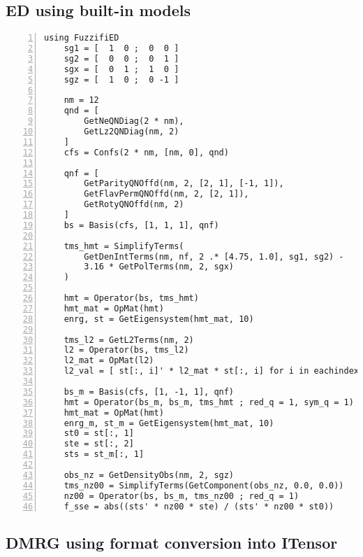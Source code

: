 \documentclass{timesjhep}
\begin{document}
\subsection{ED using built-in models}
\label{app:code_ed2}

\begin{lstlisting}[numbers=left]
    using FuzzifiED
    sg1 = [  1  0 ;  0  0 ]
    sg2 = [  0  0 ;  0  1 ]
    sgx = [  0  1 ;  1  0 ]
    sgz = [  1  0 ;  0 -1 ]

    nm = 12
    qnd = [
        GetNeQNDiag(2 * nm),
        GetLz2QNDiag(nm, 2)
    ]
    cfs = Confs(2 * nm, [nm, 0], qnd)

    qnf = [
        GetParityQNOffd(nm, 2, [2, 1], [-1, 1]),
        GetFlavPermQNOffd(nm, 2, [2, 1]),
        GetRotyQNOffd(nm, 2)
    ]
    bs = Basis(cfs, [1, 1, 1], qnf)

    tms_hmt = SimplifyTerms(
        GetDenIntTerms(nm, nf, 2 .* [4.75, 1.0], sg1, sg2) -
        3.16 * GetPolTerms(nm, 2, sgx)
    )

    hmt = Operator(bs, tms_hmt)
    hmt_mat = OpMat(hmt)
    enrg, st = GetEigensystem(hmt_mat, 10)

    tms_l2 = GetL2Terms(nm, 2)
    l2 = Operator(bs, tms_l2)
    l2_mat = OpMat(l2)
    l2_val = [ st[:, i]' * l2_mat * st[:, i] for i in eachindex(enrg)]

    bs_m = Basis(cfs, [1, -1, 1], qnf)
    hmt = Operator(bs_m, bs_m, tms_hmt ; red_q = 1, sym_q = 1)
    hmt_mat = OpMat(hmt)
    enrg_m, st_m = GetEigensystem(hmt_mat, 10)
    st0 = st[:, 1]
    ste = st[:, 2]
    sts = st_m[:, 1]

    obs_nz = GetDensityObs(nm, 2, sgz)
    tms_nz00 = SimplifyTerms(GetComponent(obs_nz, 0.0, 0.0))
    nz00 = Operator(bs, bs_m, tms_nz00 ; red_q = 1)
    f_sse = abs((sts' * nz00 * ste) / (sts' * nz00 * st0))
\end{lstlisting}

\subsection{DMRG using format conversion into ITensor}
\end{document}

